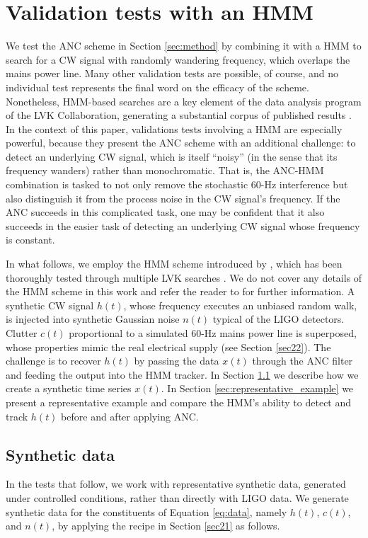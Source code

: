 \documentclass[pra,superscriptaddress,reprint,amsmath,amssymb,nofootinbib]{revtex4-2}
\begin{document}
\section{Validation tests with an HMM} \label{sec:results}
We test the ANC scheme in Section \ref{sec:method} by combining it with a HMM to search for a CW signal with randomly wandering frequency, which overlaps the mains power line. Many other validation tests are possible, of course, and no individual test represents the final word on the efficacy of the scheme. Nonetheless, HMM-based searches are a key element of the data analysis program of the LVK Collaboration, generating a substantial corpus of published results \citep{LIGOMarkov17,LIGOMarkov19,PhysRevD.99.084042,2018PhRvD..97d3013S,LIGOMarkov22,2023PhRvD.107f4062V}. In the context of this paper, validations tests involving a HMM are especially powerful, because they present the ANC scheme with an additional challenge: to detect an underlying CW signal, which is itself ``noisy'' (in the sense that its frequency wanders) rather than monochromatic. That is, the ANC-HMM combination is tasked to not only remove the stochastic 60-Hz interference but also distinguish it from the process noise in the CW signal's frequency. If the ANC succeeds in this complicated task, one may be confident that it also succeeds in the easier task of detecting an underlying CW signal whose frequency is constant.  \newline 

In what follows, we employ the HMM scheme introduced by \citet{Suvorova2016PhRv}, which has been thoroughly tested through multiple LVK searches \cite{Piccinni2022,Riles2023,Wette2023}. We do not cover any details of the HMM scheme in this work and refer the reader to \citet{Suvorova2016PhRv} for further information. A synthetic CW signal $h(t)$, whose frequency executes an unbiased random walk, is injected into synthetic Gaussian noise $n(t)$ typical of the LIGO detectors. Clutter $c(t)$ proportional to a simulated 60-Hz mains power line is superposed, whose properties mimic the real electrical supply (see Section \ref{sec22}). The challenge is to recover $h(t)$ by passing the data $x(t)$ through the ANC filter and feeding the output into the HMM tracker. In Section \ref{sec:creating_data} we describe how we create a synthetic time series $x(t)$. In Section \ref{sec:representative_example} we present a representative example and compare the HMM's ability to detect and track $h(t)$ before and after applying ANC. 

\subsection{Synthetic data} \label{sec:creating_data}
In the tests that follow, we work with representative synthetic data, generated under controlled conditions, rather than directly with LIGO data. We generate synthetic data for the constituents of Equation \eqref{eq:data}, namely $h(t)$, $c(t)$, and $n(t)$, by applying the recipe in Section \ref{sec21} as follows. \newline 
\end{document}
